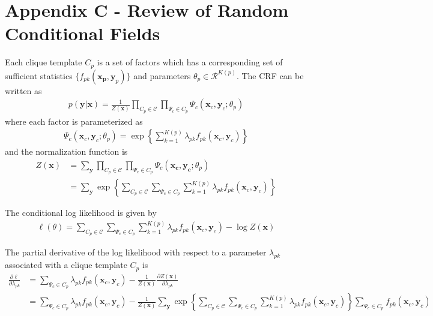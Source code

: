 \section{Appendix C - Review of Random Conditional Fields}
Each clique template $C_p$ is a set of factors which has a corresponding set
of sufficient statistics $\{f_{pk}(\mathbf{x_p}, \mathbf{y}_p)\}$ and
parameters $\theta_p\in\mathcal{R}^{K(p)}$. The CRF can be written as
\begin{align}
p(\mathbf{y}|\mathbf{x}) = \frac{1}{Z(\mathbf{x})}\prod_{C_p\in
\mathcal{C}}\prod_{\Psi_c\in C_p}\Psi_c(\mathbf{x}_c,
\mathbf{y}_c;\theta_p)
\end{align}
where each factor is parameterized as
\begin{align}
\Psi_c(\mathbf{x}_c, \mathbf{y}_c;\theta_p) =
\exp\left\{\sum_{k=1}^{K(p)}\lambda_{pk}f_{pk}(\mathbf{x}_c,
\mathbf{y}_c)\right\}
\end{align}
and the normalization function is 
\begin{align}
Z(\mathbf{x}) 
&= \sum_{\mathbf{y}}\prod_{C_p\in\mathcal{C}}\prod_{\Psi_c\in
C_p}\Psi_c(\mathbf{x_c}, \mathbf{y_c}; \theta_p)\\
&= \sum_{\mathbf{y}}\exp\left\{\sum_{C_p\in\mathcal{C}}\sum_{\Psi_c\in
C_p}\sum_{k=1}^{K(p)}\lambda_{pk}f_{pk}(\mathbf{x}_c,
\mathbf{y}_c)\right\}
\end{align}

The conditional log likelihood is given by 
\begin{align}
\ell(\theta) = \sum_{C_p\in\mathcal{C}}\sum_{\Psi_c\in
C_p}\sum_{k=1}^{K(p)}\lambda_{pk}f_{pk}(\mathbf{x}_c, \mathbf{y}_c) - \log Z(\mathbf{x})
\end{align}

The partial derivative of the log likelihood with respect to a parameter
$\lambda_{pk}$ associated with a clique template $C_p$ is
\begin{align}
\frac{\partial\ell}{\partial\lambda_{pk}} 
&= \sum_{\Psi_c\in C_p}\lambda_{pk}f_{pk}(\mathbf{x}_c, \mathbf{y}_c) -
\frac{1}{Z(\mathbf{x})}\frac{\partial Z(\mathbf{x})}{\partial\lambda_{pk}}\\
&= \sum_{\Psi_c\in C_p}\lambda_{pk}f_{pk}(\mathbf{x}_c, \mathbf{y}_c) -
\frac{1}{Z(\mathbf{x})}\sum_{\mathbf{y}}\exp\left\{\sum_{C_p\in\mathcal{C}}\sum_{\Psi_c\in
C_p}\sum_{k=1}^{K(p)}\lambda_{pk}f_{pk}(\mathbf{x}_c,
\mathbf{y}_c)\right\}\sum_{\Psi_c\in C_p}f_{pk}(\mathbf{x}_c, \mathbf{y}_c)
\end{align}
